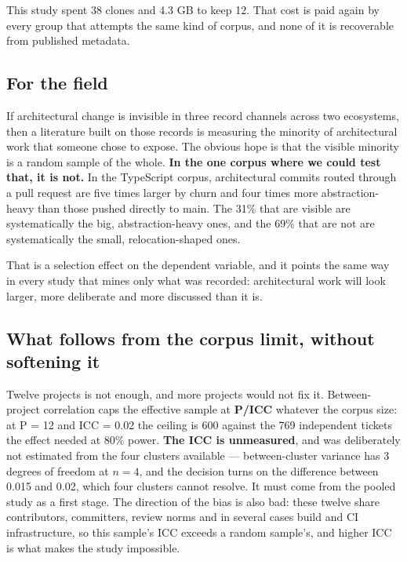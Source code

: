 \documentclass[conference]{IEEEtran}
\begin{document}
This study spent 38 clones and 4.3 GB to keep 12. That cost is paid again by every group that attempts the same kind of corpus, and none of it is recoverable from published metadata.

\subsection{For the field}
\label{sec:7.3}

If architectural change is invisible in three record channels across two ecosystems, then a literature built on those records is measuring the minority of architectural work that someone chose to expose. The obvious hope is that the visible minority is a random sample of the whole. \textbf{In the one corpus where we could test that, it is not.} In the TypeScript corpus, architectural commits routed through a pull request are five times larger by churn and four times more abstraction-heavy than those pushed directly to main. The 31\% that are visible are systematically the big, abstraction-heavy ones, and the 69\% that are not are systematically the small, relocation-shaped ones.

That is a selection effect on the dependent variable, and it points the same way in every study that mines only what was recorded: architectural work will look larger, more deliberate and more discussed than it is.

\subsection{What follows from the corpus limit, without softening it}
\label{sec:7.4}

Twelve projects is not enough, and more projects would not fix it. Between-project correlation caps the effective sample at \textbf{P/ICC} whatever the corpus size: at P = 12 and ICC = 0.02 the ceiling is 600 against the 769 independent tickets the effect needed at 80\% power. \textbf{The ICC is unmeasured}, and was deliberately not estimated from the four clusters available --- between-cluster variance has 3 degrees of freedom at $n = 4$, and the decision turns on the difference between 0.015 and 0.02, which four clusters cannot resolve. It must come from the pooled study as a first stage. The direction of the bias is also bad: these twelve share contributors, committers, review norms and in several cases build and CI infrastructure, so this sample's ICC exceeds a random sample's, and higher ICC is what makes the study impossible.
\end{document}
